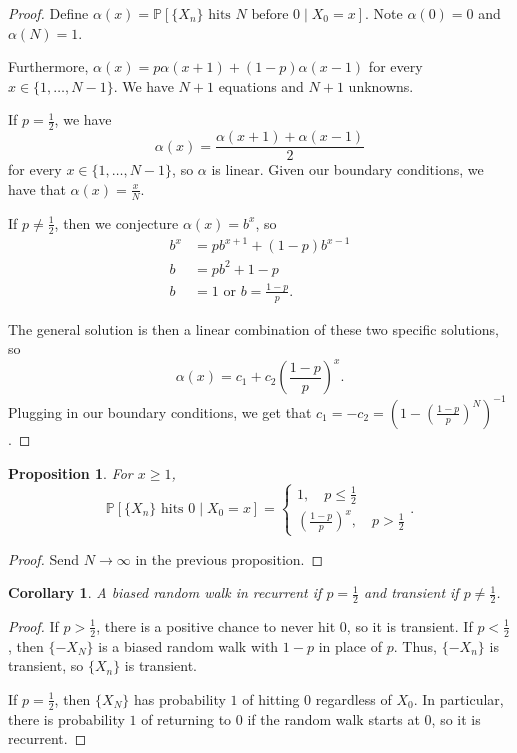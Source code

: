 \documentclass{tufte-handout}
\renewcommand*\P{\mathbb{P}}
\newtheorem{cor}[thm]{Corollary}
\newtheorem{prop}[thm]{Proposition}
\theoremstyle{definition}
\begin{document}
\begin{proof}
	Define $\alpha(x) = \P\left[\{X_n\} \text{ hits } N \text{ before } 0 \mid X_0 = x\right]$. Note $\alpha(0) = 0$ and $\alpha(N) = 1$.

	Furthermore, $\alpha(x) = p \alpha(x+1) + (1-p) \alpha(x-1)$ for every $x \in \{ 1, \ldots,N-1\}$. We have $N+1$ equations and $N+1$ unknowns.

	If $p=\frac{1}{2}$, we have \[
		\alpha(x) = \frac{\alpha(x+1) + \alpha(x-1)}{2}
	\] for every $x \in \{1,\ldots,N-1\}$, so $\alpha$ is linear. Given our boundary conditions, we have that $\alpha(x) = \frac{x}{N}$.

	If $p \ne \frac{1}{2}$, then we conjecture $\alpha(x) = b^{x}$, so
	\begin{align*}
		b^{x} &= pb^{x+1} + (1-p)b^{x-1} \\
		b &= pb^2 + 1-p \\
		b &= 1 \text{ or } b = \frac{1-p}{p}
	.\end{align*}

	The general solution is then a linear combination of these two specific solutions, so \[
		\alpha(x) = c_1 + c_2 \left(\frac{1-p}{p}\right)^{x}
	.\] Plugging in our boundary conditions, we get that $c_1 = -c_2 = \left( 1- \left( \frac{1-p}{p} \right)^{N} \right)^{-1}$.
\end{proof}

\begin{prop}
	For $x \ge 1$, \[
		\P\left[\{X_n\} \text{ hits } 0 \mid X_0 = x\right] = \begin{cases}
			1, \quad p \le \frac{1}{2} \\
			\left( \frac{1-p}{p} \right)^{x}, \quad p > \frac{1}{2}
		\end{cases}
	.\] 	
\end{prop}

\begin{proof}
	Send $N \to \infty$ in the previous proposition.
\end{proof}

\begin{cor}
	A biased random walk in recurrent if $p = \frac{1}{2}$ and transient if $p \ne \frac{1}{2}$.
\end{cor}

\begin{proof}
	If $p > \frac{1}{2}$, there is a positive chance to never hit $0$, so it is transient. If $p < \frac{1}{2}$, then $\{-X_N\}$ is a biased random walk with $1-p$ in place of $p$. Thus, $\{-X_n\}$ is transient, so $\{X_n\}$ is transient.

	If $p=\frac{1}{2}$, then $\{X_N\}$ has probability $1$ of hitting 0 regardless of $X_0$. In particular, there is probability $1$ of returning to 0 if the random walk starts at 0, so it is recurrent.
\end{proof}
\end{document}
